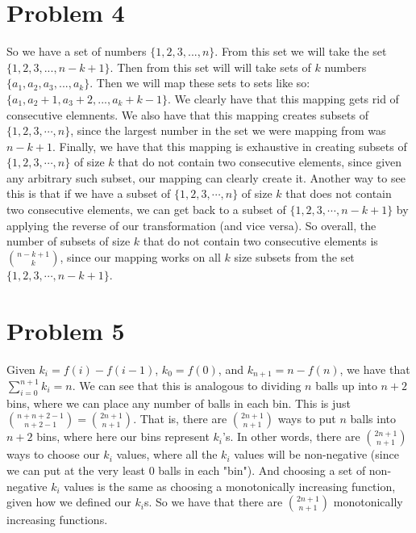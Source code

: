 \documentclass{article}
\begin{document}
\section*{Problem 4}
So we have a set of numbers $\{1,2,3,...,n\}$. From this set we will take the set
$\{1,2,3,..., n-k+1\}$. Then from this set will will take sets of $k$ numbers
$\{a_1, a_2, a_3, ..., a_k\}$. Then we will map these sets to sets like so:
$\{a_1, a_2 + 1, a_3 + 2, ..., a_k + k - 1\}$. We clearly have that this mapping
gets rid of consecutive elemnents. We also have that this mapping creates subsets
of $\{1,2,3,\cdots,n\}$, since the largest number in the set we were mapping
from was $n-k+1$. Finally, we have that this mapping is exhaustive in
creating subsets of $\{1,2,3,\cdots,n\}$ of size $k$ that do not contain
two consecutive elements, since given any arbitrary such subset, our mapping
can clearly create it. Another way to see this is that if we have
a subset of $\{1,2,3,\cdots,n\}$ of size $k$ that does not contain two
consecutive elements, we can get back to a subset of $\{1,2,3,\cdots,n-k+1\}$
by applying the reverse of our transformation (and vice versa).
So overall, the number of subsets of size $k$ that do not contain two
consecutive elements is $\binom{n-k+1}{k}$, since our mapping works on all
$k$ size subsets from the set $\{1,2,3,\cdots,n-k+1\}$.

\section*{Problem 5}
Given $k_i = f(i) - f(i-1)$, $k_0 = f(0)$, and $k_{n+1} = n - f(n)$, we have that
$\sum_{i=0}^{n+1} k_i = n$. We can see that this is analogous to dividing $n$ balls
up into $n+2$ bins, where we can place any number
of balls in each bin. This is just $\binom{n+n+2-1}{n+2-1} = \binom{2n+1}{n+1}$. That
is, there are $\binom{2n+1}{n+1}$ ways to put $n$ balls into $n+2$ bins, where
here our bins represent $k_i$'s. In other words, there are $\binom{2n+1}{n+1}$ ways
to choose our $k_i$ values, where all the $k_i$ values will be non-negative (since
we can put at the very least 0 balls in each "bin"). And choosing a set of
non-negative $k_i$ values is the same as choosing a monotonically increasing
function, given how we defined our $k_i$s. So we have that there are
$\binom{2n+1}{n+1}$ monotonically increasing functions.
\end{document}
